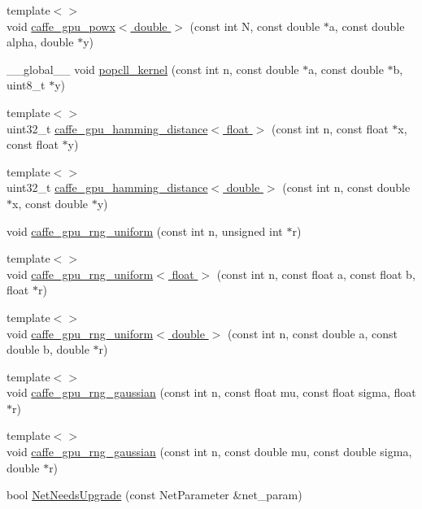 \begin{DoxyCompactItemize}
\item 
{\footnotesize template$<$$>$ }\\void \hyperlink{namespacecaffe_a9ae99fa052a8edddd8d431595e8dc317}{caffe\+\_\+gpu\+\_\+powx$<$ double $>$} (const int N, const double $\ast$a, const double alpha, double $\ast$y)
\item 
\+\_\+\+\_\+global\+\_\+\+\_\+ void \hyperlink{namespacecaffe_ae307157ab0a91393f5708d5a37bf83bc}{popcll\+\_\+kernel} (const int n, const double $\ast$a, const double $\ast$b, uint8\+\_\+t $\ast$y)
\item 
{\footnotesize template$<$$>$ }\\uint32\+\_\+t \hyperlink{namespacecaffe_aa9d0abbc1318f21d421c50b8e9681566}{caffe\+\_\+gpu\+\_\+hamming\+\_\+distance$<$ float $>$} (const int n, const float $\ast$x, const float $\ast$y)
\item 
{\footnotesize template$<$$>$ }\\uint32\+\_\+t \hyperlink{namespacecaffe_ae6f219822c198a5ebfc14b79d56aac7b}{caffe\+\_\+gpu\+\_\+hamming\+\_\+distance$<$ double $>$} (const int n, const double $\ast$x, const double $\ast$y)
\item 
void \hyperlink{namespacecaffe_aee22d10249c5dd157d15a79bb8891bf8}{caffe\+\_\+gpu\+\_\+rng\+\_\+uniform} (const int n, unsigned int $\ast$r)
\item 
{\footnotesize template$<$$>$ }\\void \hyperlink{namespacecaffe_a077eb739db57fe3655d0def343fe0c4c}{caffe\+\_\+gpu\+\_\+rng\+\_\+uniform$<$ float $>$} (const int n, const float a, const float b, float $\ast$r)
\item 
{\footnotesize template$<$$>$ }\\void \hyperlink{namespacecaffe_a31407c00a3d32c77016b8382ae19ebb2}{caffe\+\_\+gpu\+\_\+rng\+\_\+uniform$<$ double $>$} (const int n, const double a, const double b, double $\ast$r)
\item 
{\footnotesize template$<$$>$ }\\void \hyperlink{namespacecaffe_aeb58f68cc8d5f8b7dba8537dc1932cb9}{caffe\+\_\+gpu\+\_\+rng\+\_\+gaussian} (const int n, const float mu, const float sigma, float $\ast$r)
\item 
{\footnotesize template$<$$>$ }\\void \hyperlink{namespacecaffe_a7536554fa0f49cb776354d384689e38b}{caffe\+\_\+gpu\+\_\+rng\+\_\+gaussian} (const int n, const double mu, const double sigma, double $\ast$r)
\item 
bool \hyperlink{namespacecaffe_a83f79549cfd215fa6b8dc19ef3cc17f8}{Net\+Needs\+Upgrade} (const Net\+Parameter \&net\+\_\+param)

\end{DoxyCompactItemize}
